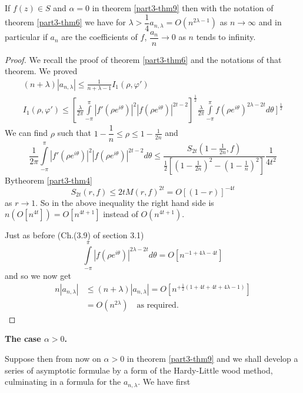 \begin{thm}\label{part3-thm10}
If $f(z)\in S$ and $\alpha=0$ in theorem \ref{part3-thm9} then with
the notation of theorem \ref{part3-thm6} we have for
$\lambda>\dfrac{1}{4}a_{n,\lambda}=O(n^{2\lambda-1})$ as $n\to \infty$
and in particular if $a_{n}$ are the coefficients of $f$,
$\dfrac{a_{n}}{n}\to 0$ as $n$ tends to infinity.
\end{thm}

\begin{proof}
We recall the proof of theorem \ref{part3-thm6} and the notations of
that theorem. We proved
\begin{gather*}
(n+\lambda)|a_{n,\lambda}|\leq
  \frac{1}{n+\lambda-1}I_{1}(\rho,\varphi')\\
I_{1}(\rho,\varphi')\leq
\left[\frac{\lambda}{2\pi}\int\limits^{\pi}_{-\pi}|f'(\rho
  e^{i\theta})|^{2}|f(\rho
  e^{i\theta})|^{2t-2}\right]^{\frac{1}{2}}\frac{\lambda}{2\pi}
\int\limits^{\pi}_{-\pi} f(\rho
e^{i\theta})^{2\lambda-2t}d\theta\left.\right]^{\frac{1}{2}}
\end{gather*}
We can find $\rho$ such that $1-\dfrac{1}{n}\leq \rho\leq
1-\frac{1}{2n}$ and
$$ 
\frac{1}{2\pi}\int\limits^{\pi}_{-\pi}|f'(\rho
e^{i\theta})|^{2}|f(\rho e^{i\theta})|^{2t-2}d\theta\leq 
 \frac{S_{2t}\left(1-\frac{1}{2n},f\right)}{\frac{1}{2}
   \left[\left(1-\frac{1}{2n}\right)^{2} -
     \left(1-\frac{1}{n}\right)^{2}\right]}\frac{1}{4t^{2}}  
$$
By\pageoriginale theorem \ref{part3-thm4}
$$
S_{2t}(r,f)\leq 2tM(r,f)^{2t}=O[(1-r)]^{-4t}
$$
as $r\to 1$. So in the above inequality the right hand side is
$n\left(O[n^{4t}]\right)=O[n^{4t+1}]$ instead of $O(n^{4t+1})$.

Just as before (Ch.\@ (3.9) of section 3.1)
$$
\int\limits^{\pi}_{-\pi}|f(\rho
e^{i\theta})|^{2\lambda-2t}d\theta = O\left[n^{-1+4\lambda-4t}\right] 
$$
and so we now get
\begin{align*}
n|a_{n,\lambda}| &\leq
(n+\lambda)|a_{n,\lambda}| = O \left[n^{+\frac{1}{2}(1+4t+4t+4\lambda-1)}\right]\\
&= O(n^{2\lambda})\quad\text{as required.}
\end{align*}
\end{proof}

\noindent
{\bf The case {\boldmath$\alpha>0$}.}

Suppose then from now on $\alpha>0$ in theorem \ref{part3-thm9} and we
shall develop a series of asymptotic formulae by a form of the
Hardy-Little wood method, culminating in a formula for the
$a_{n,\lambda}$. We have first

